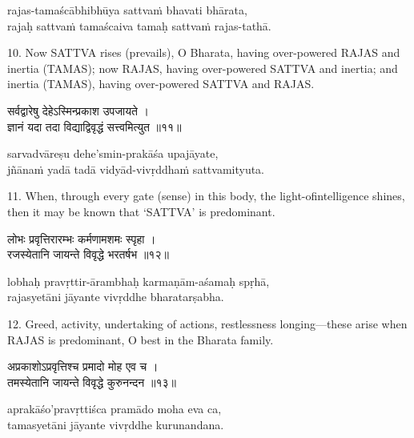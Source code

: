 \begin{transliteration}
rajas-tamaścābhibhūya sattvaṁ bhavati bhārata, \\
rajaḥ sattvaṁ tamaścaiva tamaḥ sattvaṁ rajas-tathā.
\end{transliteration}

10. Now SATTVA rises (prevails), O Bharata, having over-powered RAJAS and
inertia (TAMAS); now RAJAS, having over-powered SATTVA and inertia; and inertia
(TAMAS), having over-powered SATTVA and RAJAS.\@

\begin{gitaverse}
सर्वद्वारेषु देहेऽस्मिन्प्रकाश उपजायते । \\
ज्ञानं यदा तदा विद्याद्विवृद्धं सत्त्वमित्युत ॥११॥
\end{gitaverse}

\begin{transliteration}
sarvadvāreṣu dehe'smin-prakāśa upajāyate, \\
jñānaṁ yadā tadā vidyād-vivṛddhaṁ sattvamityuta.
\end{transliteration}

11. When, through every gate (sense) in this body, the light-ofintelligence
shines, then it may be known that `SATTVA' is predominant.

\begin{gitaverse}
लोभः प्रवृत्तिरारम्भः कर्मणामशमः स्पृहा । \\
रजस्येतानि जायन्ते विवृद्धे भरतर्षभ ॥१२॥
\end{gitaverse}

\begin{transliteration}
lobhaḥ pravṛttir-ārambhaḥ karmaṇām-aśamaḥ spṛhā, \\
rajasyetāni jāyante vivṛddhe bharatarṣabha.
\end{transliteration}

12. Greed, activity, undertaking of actions, restlessness longing---these arise
when RAJAS is predominant, O best in the Bharata family.

\begin{gitaverse}
अप्रकाशोऽप्रवृत्तिश्च प्रमादो मोह एव च । \\
तमस्येतानि जायन्ते विवृद्धे कुरुनन्दन ॥१३॥
\end{gitaverse}

\begin{transliteration}
aprakāśo'pravṛttiśca pramādo moha eva ca, \\
tamasyetāni jāyante vivṛddhe kurunandana.
\end{transliteration}

